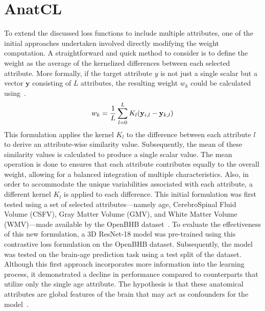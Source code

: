 \section{AnatCL}
To extend the discussed loss functions to include multiple attributes, one of
the initial approaches undertaken involved directly modifying the weight
computation. A straightforward and quick method to consider is to define the
weight as the average of the kernelized differences between each selected
attribute. More formally, if the target attribute $y$ is not just a single
scalar but a vector $\mathbf{y}$ consisting of $L$ attributes, the resulting
weight $w_k$ could be calculated using~.
\begin{equation}
    \labeq{4_7}
    w_k = \frac{1}{L} \sum_{l=0}^{L} K_l ( \mathbf{y}_{i,l} - \mathbf{y}_{k, l} )
\end{equation}
This formulation applies the kernel $K_l$ to the difference between each
attribute $l$ to derive an attribute-wise similarity value. Subsequently, the
mean of these similarity values is calculated to produce a single scalar value.
The mean operation is done to ensures that each attribute contributes equally to
the overall weight, allowing for a balanced integration of multiple
characteristics. Also, in order to accommodate the unique variabilities
associated with each attribute, a different kernel $K_l$ is applied to each
difference.
This initial formulation was first tested using a set of selected
attributes—namely age, CerebroSpinal Fluid Volume (CSFV), Gray Matter Volume
(GMV), and White Matter Volume (WMV)—made available by the OpenBHB
dataset~. To evaluate the effectiveness of this
new formulation, a 3D ResNet-18 model was pre-trained using this contrastive
loss formulation on the OpenBHB dataset. Subsequently, the model was tested on
the brain-age prediction task using a test split of the dataset. Although this
first approach incorporates more information into the learning process, it
demonstrated a decline in performance compared to counterparts that utilize only
the single age attribute. The hypothesis is that these anatomical attributes are global features
of the brain that may act as confounders for the
model~.

